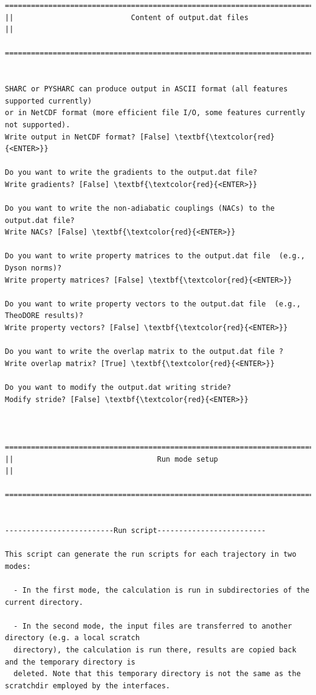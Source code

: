 \documentclass[a4paper,11pt,DIV=15,openany]{scrbook}
\begin{document}
\begin{oframed}
\begin{Verbatim}[commandchars=\\\{\}]
  ================================================================================
||                           Content of output.dat files                          ||
  ================================================================================


SHARC or PYSHARC can produce output in ASCII format (all features supported currently)
or in NetCDF format (more efficient file I/O, some features currently not supported).
Write output in NetCDF format? [False] \textbf{\textcolor{red}{<ENTER>}}

Do you want to write the gradients to the output.dat file?
Write gradients? [False] \textbf{\textcolor{red}{<ENTER>}}

Do you want to write the non-adiabatic couplings (NACs) to the output.dat file?
Write NACs? [False] \textbf{\textcolor{red}{<ENTER>}}

Do you want to write property matrices to the output.dat file  (e.g., Dyson norms)?
Write property matrices? [False] \textbf{\textcolor{red}{<ENTER>}}

Do you want to write property vectors to the output.dat file  (e.g., TheoDORE results)?
Write property vectors? [False] \textbf{\textcolor{red}{<ENTER>}}

Do you want to write the overlap matrix to the output.dat file ?
Write overlap matrix? [True] \textbf{\textcolor{red}{<ENTER>}}

Do you want to modify the output.dat writing stride?
Modify stride? [False] \textbf{\textcolor{red}{<ENTER>}}


  ================================================================================
||                                 Run mode setup                                 ||
  ================================================================================


-------------------------Run script-------------------------

This script can generate the run scripts for each trajectory in two modes:

  - In the first mode, the calculation is run in subdirectories of the current directory.

  - In the second mode, the input files are transferred to another directory (e.g. a local scratch 
  directory), the calculation is run there, results are copied back and the temporary directory is 
  deleted. Note that this temporary directory is not the same as the scratchdir employed by the interfaces.


\end{Verbatim}
\end{oframed}
\end{document}
